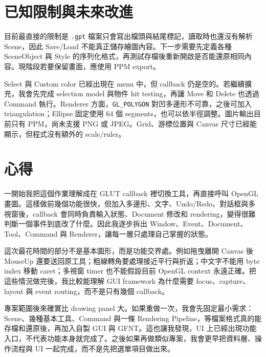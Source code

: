 \section{已知限制與未來改進}
\label{sec:limitations}

目前最直接的限制是 \lstinline|.gpt| 檔案只會寫出檔頭與結尾標記，讀取時也還沒有解析 Scene，因此 Save/Load 不能真正儲存繪圖內容。下一步需要先定義各種 SceneObject 與 Style 的序列化格式，再測試存檔後重新開啟是否能還原相同內容。現階段若要保留畫面，應使用 PPM export。

Select 與 Custom color 已經出現在 menu 中，但 callback 仍是空的。若繼續擴充，我會先完成 selection model 與物件 hit testing，再讓 Move 和 Delete 也透過 Command 執行。Renderer 方面，\lstinline|GL_POLYGON| 對凹多邊形不可靠，之後可加入 triangulation；Ellipse 固定使用 64 個 segments，也可以依半徑調整。圖片輸出目前只有 PPM，尚未支援 PNG 或 JPEG。Grid、游標位置與 Canvas 尺寸已經能顯示，但程式沒有額外的 scale/ruler。

\section{心得}

一開始我把這個作業理解成在 GLUT callback 裡切換工具，再直接呼叫 OpenGL 畫圖。這樣做前幾個功能很快，但加入多邊形、文字、Undo/Redo、對話框與多視窗後，callback 會同時負責輸入狀態、Document 修改和 rendering，變得很難判斷一個事件到底改了什麼。因此我逐步拆出 Window、Event、Document、Tool、Command 與 Renderer，讓每一層只處理自己掌握的狀態。

這次最花時間的部分不是基本圖形，而是功能交界處。例如拖曳離開 Canvas 後 MouseUp 還要送回原工具；粗線轉角要處理接近平行與折返；中文字不能用 byte index 移動 caret；多視窗 timer 也不能假設目前 OpenGL context 永遠正確。把這些情況做完後，我比較能理解 GUI framework 為什麼需要 focus、capture、layout 與 event routing，而不是只有幾個 callback。

專案範圍後來確實比 drawing panel 大。如果重做一次，我會先固定最小需求：Scene、幾種基本工具、Command 與一條 Rendering Pipeline，等檔案格式真的能存檔和還原後，再加入自製 GUI 與 GFNT。這也讓我發現，UI 上已經出現功能入口，不代表功能本身就完成了。之後如果再做類似專案，我會更早把資料層、操作流程與 UI 一起完成，而不是先把選單項目做出來。
